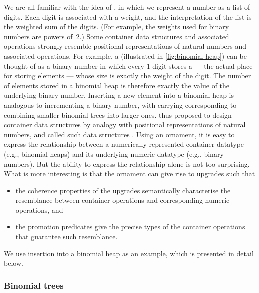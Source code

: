 We are all familiar with the idea of , in which we represent a number as a list of digits.
Each digit is associated with a weight, and the interpretation of the list is the weighted sum of the digits.
(For example, the weights used for binary numbers are powers of~$2$.)
Some container data structures and associated operations strongly resemble positional representations of natural numbers and associated operations.
For example, a  (illustrated in \autoref{fig:binomial-heap}) can be thought of as a binary number in which every $1$-digit stores a  --- the actual place for storing elements --- whose size is exactly the weight of the digit.
The number of elements stored in a binomial heap is therefore exactly the value of the underlying binary number.
Inserting a new element into a binomial heap is analogous to incrementing a binary number, with carrying corresponding to combining smaller binomial trees into larger ones.
\citeauthor{Okasaki-data-structures} thus proposed to design container data structures by analogy with positional representations of natural numbers, and called such data structures .
Using an ornament, it is easy to express the relationship between a numerically represented container datatype (e.g., binomial heaps) and its underlying numeric datatype (e.g., binary numbers).
But the ability to express the relationship alone is not too surprising.
What is more interesting is that the ornament can give rise to upgrades such that
\begin{itemize}
\item the coherence properties of the upgrades semantically characterise the resemblance between container operations and corresponding numeric operations, and
\item the promotion predicates give the precise types of the container operations that guarantee such resemblance.
\end{itemize}
We use insertion into a binomial heap as an example, which is presented in detail below.

\subsubsection{Binomial trees}


